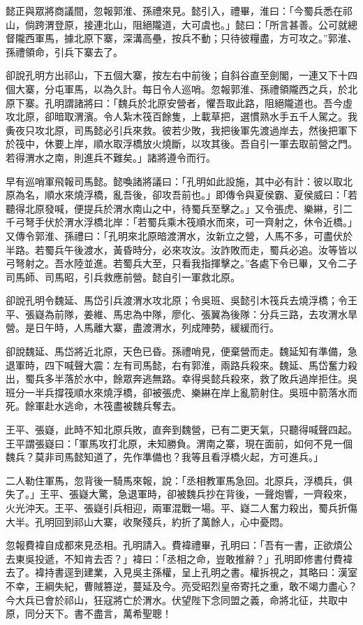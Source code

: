 懿正與眾將商議間，忽報郭淮、孫禮來見。懿引入，禮畢，淮曰：「今蜀兵悉在祁山，倘跨渭登原，接連北山，阻絕隴道，大可虞也。」懿曰：「所言甚善。公可就總督隴西軍馬，據北原下寨，深溝高壘，按兵不動；只待彼糧盡，方可攻之。”郭淮、孫禮領命，引兵下寨去了。

卻說孔明方出祁山，下五個大寨，按左右中前後；自斜谷直至劍閣，一連又下十四個大寨，分屯軍馬，以為久計。每日令人巡哨。忽報郭淮、孫禮領隴西之兵，於北原下寨。孔明謂諸將曰：「魏兵於北原安營者，懼吾取此路，阻絕隴道也。吾今虛攻北原，卻暗取渭濱。令人紮木筏百餘隻，上載草把，選慣熟水手五千人駕之。我夤夜只攻北原，司馬懿必引兵來救。彼若少敗，我把後軍先渡過岸去，然後把軍下於筏中，休要上岸，順水取浮橋放火燒斷，以攻其後。吾自引一軍去取前營之門。若得渭水之南，則進兵不難矣。」諸將遵令而行。

早有巡哨軍飛報司馬懿。懿喚諸將議曰：「孔明如此設施，其中必有計：彼以取北原為名，順水來燒浮橋，亂吾後，卻攻吾前也。」即傳令與夏侯霸、夏侯威曰：「若聽得北原發喊，便提兵於渭水南山之中，待蜀兵至擊之。」又令張虎、樂綝，引二千弓弩手伏於渭水浮橋北岸：「若蜀兵乘木筏順水而來，可一齊射之，休令近橋。」又傳令郭淮、孫禮曰：「孔明來北原暗渡渭水，汝新立之營，人馬不多，可盡伏於半路。若蜀兵午後渡水，黃昏時分，必來攻汝。汝詐敗而走，蜀兵必追。汝等皆以弓弩射之。吾水陸並進。若蜀兵大至，只看我指揮擊之。”各處下令已畢，又令二子司馬師、司馬昭，引兵救應前營。懿自引一軍救北原。

卻說孔明令魏延、馬岱引兵渡渭水攻北原；令吳班、吳懿引木筏兵去燒浮橋；令王平、張嶷為前隊，姜維、馬忠為中隊，廖化、張翼為後隊：分兵三路，去攻渭水旱營。是日午時，人馬離大寨，盡渡渭水，列成陣勢，緩緩而行。

卻說魏延、馬岱將近北原，天色已昏。孫禮哨見，便棄營而走。魏延知有準備，急退軍時，四下喊聲大震：左有司馬懿，右有郭淮，兩路兵殺來。魏延、馬岱奮力殺出，蜀兵多半落於水中，餘眾奔逃無路。幸得吳懿兵殺來，救了敗兵過岸拒住。吳班分一半兵撐筏順水來燒浮橋，卻被張虎、樂綝在岸上亂箭射住。吳班中箭落水而死。餘軍赴水逃命，木筏盡被魏兵奪去。

王平、張嶷，此時不知北原兵敗，直奔到魏營，已有二更天氣，只聽得喊聲四起。王平謂張嶷曰：「軍馬攻打北原，未知勝負。渭南之寨，現在面前，如何不見一個魏兵？莫非司馬懿知道了，先作準備也？我等且看浮橋火起，方可進兵。」

二人勒住軍馬，忽背後一騎馬來報，說：「丞相教軍馬急回。北原兵，浮橋兵，俱失了。」王平、張嶷大驚，急退軍時，卻被魏兵抄在背後，一聲炮響，一齊殺來，火光沖天。王平、張嶷引兵相迎，兩軍混戰一場。平、嶷二人奮力殺出，蜀兵折傷大半。孔明回到祁山大寨，收聚殘兵，約折了萬餘人，心中憂悶。

忽報費褘自成都來見丞相。孔明請入。費褘禮畢，孔明曰：「吾有一書，正欲煩公去東吳投遞，不知肯去否？」褘曰：「丞相之命，豈敢推辭？」孔明即修書付費褘去了。褘持書逕到建業，入見吳主孫權，呈上孔明之書。權拆視之，其略曰：漢室不幸，王綱失紀，曹賊篡逆，蔓延及今。亮受昭烈皇帝寄托之重，敢不竭力盡心？今大兵已會於祁山，狂寇將亡於渭水。伏望陛下念同盟之義，命將北征，共取中原，同分天下。書不盡言，萬希聖聰！

